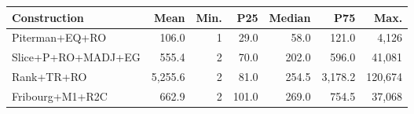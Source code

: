 \begin{tabular}{lrrrrrr}
  \hline
Construction & Mean & Min. & P25 & Median & P75 & Max. \\ 
  \hline
Piterman+EQ+RO & 106.0 & 1 & 29.0 & 58.0 & 121.0 & 4,126 \\ 
  Slice+P+RO+MADJ+EG & 555.4 & 2 & 70.0 & 202.0 & 596.0 & 41,081 \\ 
  Rank+TR+RO & 5,255.6 & 2 & 81.0 & 254.5 & 3,178.2 & 120,674 \\ 
  Fribourg+M1+R2C & 662.9 & 2 & 101.0 & 269.0 & 754.5 & 37,068 \\ 
   \hline
\end{tabular}
